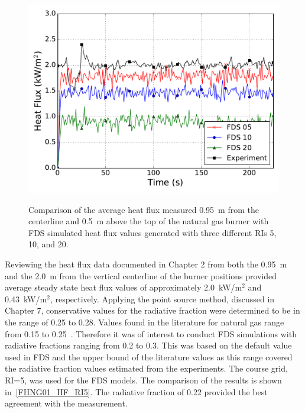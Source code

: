\documentclass[twoside]{uocthesis}
\begin{document}
{\begin{figure}
	\includegraphics[width=5in]{../Figures/FHNG01_HF_RI} \\
	\caption[Comparison of the average heat flux measured 0.95~m from the centerline and 0.5~m above the top of the natural gas burner with FDS simulated heat flux values.]{Comparison of the average heat flux measured 0.95~m from the centerline and 0.5~m above the top of the natural gas burner with FDS simulated heat flux values generated with three different RIs 5, 10, and 20.}
	\label{FHNG01_HF_RI}
\end{figure}

Reviewing the heat flux data documented in Chapter 2 from both the 0.95~m  and the 2.0~m from the vertical centerline of the burner positions provided average steady state heat flux values of approximately 2.0~kW/m$^2$ and 0.43~kW/m$^2$, respectively.  Applying the point source method, discussed in Chapter 7, conservative values for the radiative fraction were determined to be in the range of 0.25 to 0.28.  Values found in the literature for natural gas range from 0.15 to 0.25~\cite{Modak:1977,Hostikka:3}.   
Therefore it was of interest to conduct FDS simulations with radiative fractions ranging from 0.2 to 0.3.  This was based on the default value used in FDS and the upper bound of the literature values as this range covered the radiative fraction values estimated from the experiments.  The course grid, RI=5, was used for the FDS models.  The comparison of the results is shown in~\ref{FHNG01_HF_RI5}.  The radiative fraction of 0.22 provided the best agreement with the measurement.  

}
\end{document}
